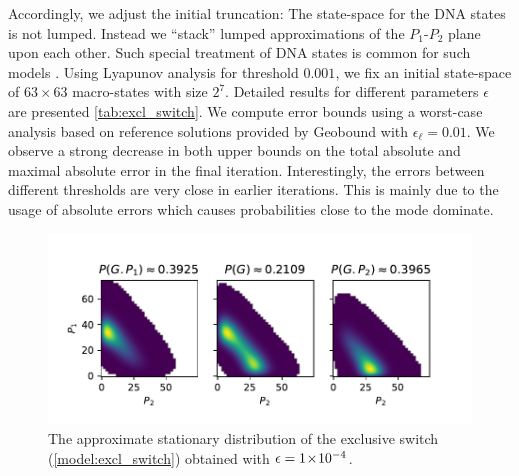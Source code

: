 Accordingly, we adjust
the initial truncation:
The state-space for the DNA states is not lumped. Instead we ``stack''
lumped approximations of the $P_1$-$P_2$ plane upon each other.
Such special treatment of DNA states is common for such models \cite{lapin2011shave}.
Using Lyapunov analysis for threshold $0.001$, we fix an initial state-space of $63\times 63$ macro-states with size $2^7$. Detailed results for different parameters $\epsilon$ are presented \autoref{tab:excl_switch}.
We compute error bounds using a worst-case analysis based on reference solutions provided by Geobound with $\epsilon_{\ell}=0.01$.
We observe a strong decrease in both upper bounds on the total absolute and maximal absolute error in the final iteration.
Interestingly, the errors between different thresholds are very close in earlier iterations.
This is mainly due to the usage of absolute errors which causes probabilities close to the mode dominate.
\begin{figure}[htb]
    \centering
    \includegraphics[scale=.7]{gfx/excl_switch_dist.pdf}
	\caption[Approximate stationary distribution of the exclusive switch]{The approximate stationary distribution of the exclusive switch (\autoref{model:excl_switch}) obtained with $\epsilon= 1\!\times\!10^{-4} $.}
    \label{fig:excl_switch:excl_switch_dist}
\end{figure}


